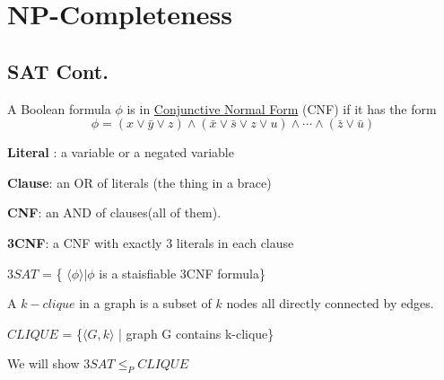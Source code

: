 \chapter{NP-Completeness}

\section{SAT Cont.}
\begin{example}
\end{example}

\begin{definition}
    A Boolean formula \(\phi\) is in \underline{Conjunctive Normal Form} (CNF) if it has the form
    \[
        \phi = (x \lor \bar{y} \lor z) \land (\bar{x} \lor \bar{s} \lor z \lor u) \land \cdots \land (\bar{z} \lor \bar{u})
    \]

    \textbf{Literal} : a variable or a negated variable

    \textbf{Clause}: an OR of literals (the thing in a brace)
    
    \textbf{CNF}: an AND of clauses(all of them).
    
    \textbf{3CNF}: a CNF with exactly 3 literals in each clause 

    \(3SAT\) = \{ \(\langle \phi \rangle | \phi\) is a staisfiable 3CNF formula\} 
\end{definition}

\begin{definition}
    A \(k-clique\) in a graph is a subset of \(k\) nodes all directly connected by edges.   

    \begin{example}
    \end{example}

    \(CLIQUE\) = \{\(\langle G, k \rangle\) | graph G contains k-clique\} 
\end{definition}

We will show \(3SAT \leq_P CLIQUE\) 

